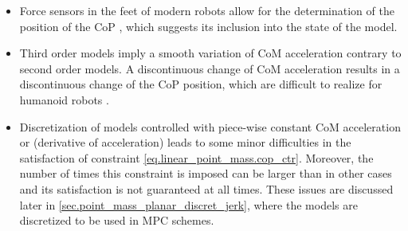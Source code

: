\begin{itemize}
    \item Force sensors in the feet of modern robots allow for the
        determination of the position of the \ac{CoP}
        \cite{Englsberger2014humanoids, Kaneko2004icra, Kaneko2009humanoids},
        which suggests its inclusion into the state of the model.

    \item Third order models imply a smooth variation of \ac{CoM} acceleration
        contrary to second order models. A discontinuous change of \ac{CoM}
        acceleration results in a discontinuous change of the \ac{CoP}
        position, which are difficult to realize for humanoid robots
        \cite{Kajita2010iros}.

    \item Discretization of models controlled with piece-wise constant \ac{CoM}
        acceleration or  (derivative of acceleration) leads to some
        minor difficulties in the satisfaction of constraint
        \cref{eq.linear_point_mass.cop_ctr}. Moreover, the number of times this
        constraint is imposed can be larger than in other cases and its
        satisfaction is not guaranteed at all times. These issues are discussed
        later in \cref{sec.point_mass_planar_discret_jerk}, where the models
        are discretized to be used in \ac{MPC} schemes.
\end{itemize}
%


